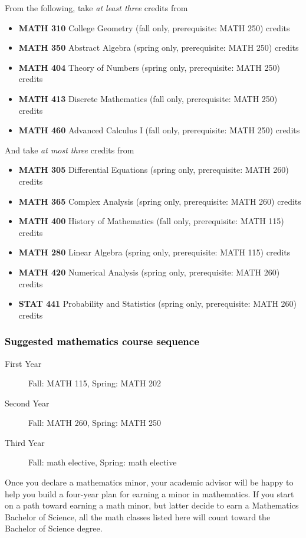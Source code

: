 \documentclass[10pt]{article}
\newcommand{\linear}{\textbf{MATH 280} Linear Algebra (spring only, prerequisite: MATH 115) \dotfill 3 credits}
\newcommand{\discrete}{\textbf{MATH 413} Discrete Mathematics  (fall only, prerequisite: MATH 250)\dotfill 3 credits}
\newcommand{\statistics}{\textbf{STAT 441} Probability and Statistics (spring only, prerequisite: MATH 260)  \dotfill  3 credits}
\newcommand{\diffeq}{\textbf{MATH 305}	Differential Equations (spring only, prerequisite: MATH 260) \dotfill 	3 credits}
\newcommand{\abstractalgebra}{\textbf{MATH 350}	Abstract Algebra (spring only, prerequisite: MATH 250) \dotfill 	3 credits}
\newcommand{\complex}{\textbf{MATH 365}	Complex Analysis (spring only,  prerequisite: MATH 260) \dotfill 3 credits}
\newcommand{\advancedcalc}{\textbf{MATH 460}	Advanced Calculus I  (fall only,   prerequisite: MATH 250) \dotfill 3 credits}
\newcommand{\numerical}{\textbf{MATH 420}   Numerical Analysis   (spring only, prerequisite: MATH 260)\dotfill 3 credits}
\newcommand{\collegegeometry}{\textbf{MATH 310}	College Geometry (fall only,  prerequisite: MATH 250) \dotfill 3 credits}
\newcommand{\mathhistory}{\textbf{MATH 400} History of Mathematics (fall only,  prerequisite: MATH 115) \dotfill 3 credits}
\newcommand{\numbertheory}{\textbf{MATH 404} Theory of Numbers (spring only,  prerequisite: MATH 250) \dotfill 3 credits}
\begin{document}
From the following, take \emph{at least three} credits from
\vspace{0.1in}

\begin{itemize}
\item \collegegeometry
\item \abstractalgebra
\item \numbertheory
\item \discrete
\item \advancedcalc
\end{itemize}

\vspace{0.1in}
\noindent And take \emph{at most  three} credits from
\vspace{0.1in}
\begin{itemize}
\item \diffeq
\item \complex
\item \mathhistory
\item \linear
\item \numerical
\item \statistics
\end{itemize}



\subsubsection*{\textcolor{black}{Suggested mathematics course sequence}}

\begin{description}
   \item[\phantom{xxx} First Year] Fall: MATH 115, Spring:  MATH 202
      \item[\phantom{xxx} Second Year]  Fall: MATH 260,  Spring: MATH 250
     \item[\phantom{xxx} Third Year]  Fall: math elective, Spring: math elective
 \end{description}
  \vspace{0.1in}

 \noindent Once you declare a mathematics minor, your academic advisor will be happy to help you build a four-year plan for earning a minor in mathematics.  If you start on a path toward earning a math minor, but latter decide to earn a  Mathematics Bachelor of Science, all the math classes listed here will count toward the Bachelor of Science degree.

   \vspace{0.1in}
\end{document}
